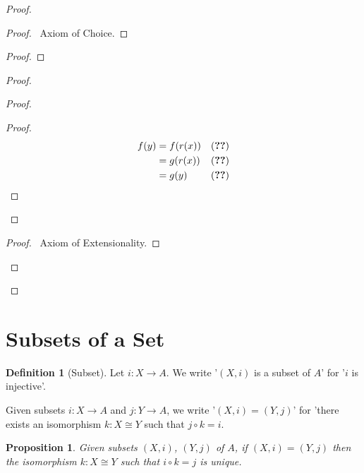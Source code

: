 \documentclass{book}
\newtheorem{prop}[ax]{Proposition}
\theoremstyle{definition}
\newtheorem{df}[ax]{Definition}
\begin{document}
\begin{proof}
\pf
{}
\begin{proof}
	\pf\ Axiom of Choice.
\end{proof}
\begin{proof}
\end{proof}
\begin{proof}
	\begin{proof}
		\begin{proof}
			\pf
			\begin{align*}
				f(y) & = f(r(x)) & (\text{\stepref{ii}}) \\
				& = g(r(x)) & (\text{\stepref{c}}) \\
				& = g(y) & (\text{\stepref{ii}})
			\end{align*}
		\end{proof}
	\end{proof}
	\begin{proof}
		\pf\ Axiom of Extensionality.
	\end{proof}
\end{proof}
\end{proof}

\section{Subsets of a Set}

\begin{df}[Subset]
Let $i : X \rightarrow A$. We write '$(X,i)$ is a subset of $A$' for '$i$ is injective'.

Given subsets $i : X \rightarrow A$ and $j : Y \rightarrow A$,
we write '$(X,i) = (Y,j)$' for 'there exists an isomorphism $k : X \cong Y$ such that $j \circ k = i$.
\end{df}

\begin{prop}
Given subsets $(X,i)$, $(Y,j)$ of $A$, if $(X,i) = (Y,j)$ then the isomorphism $k : X \cong Y$ such that $i \circ k = j$ is unique.
\end{prop}
\end{document}
